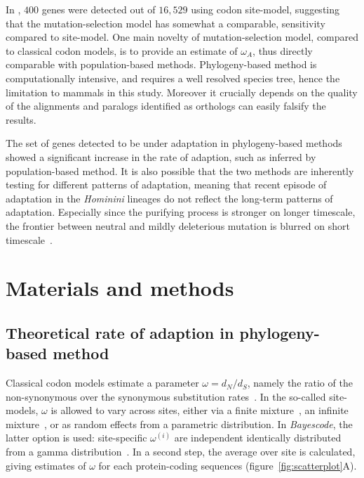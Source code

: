 \documentclass{article}
\newcommand{\dn}{d_N}
\newcommand{\ds}{d_S}
\newcommand{\dnds}{\dn / \ds}
\begin{document}
In \citet{kosiol_patterns_2008}, $400$ genes were detected out of $16,529$ using codon site-model, suggesting that the mutation-selection model has somewhat a comparable, sensitivity compared to site-model.
One main novelty of mutation-selection model, compared to classical codon models, is to provide an estimate of $\omega_A$, thus directly comparable with population-based methods.
Phylogeny-based method is computationally intensive, and requires a well resolved species tree, hence the limitation to mammals in this study.
Moreover it crucially depends on the quality of the alignments and paralogs identified as orthologs can easily falsify the results.

The set of genes detected to be under adaptation in phylogeny-based methods showed a significant increase in the rate of adaption, such as inferred by population-based method.
It is also possible that the two methods are inherently testing for different patterns of adaptation, meaning that recent episode of adaptation in the \textit{Hominini} lineages do not reflect the long-term patterns of adaptation.
Especially since the purifying process is stronger on longer timescale, the frontier between neutral and mildly deleterious mutation is blurred on short timescale~\citep{ho_time_2005}.

\section*{Materials and methods}

\subsection*{Theoretical rate of adaption in phylogeny-based method }
Classical codon models estimate a parameter $\omega=\dnds$, namely the ratio of the non-synonymous over the synonymous substitution rates~\citep{muse_likelihood_1994,goldman_codon-based_1994}.
In the so-called site-models, $\omega$ is allowed to vary across sites, either via a finite mixture~\citep{yang_codon-substitution_2000}, an infinite mixture~\citep{huelsenbeck_dirichlet_2006}, or as random effects from a parametric distribution.
In \textit{Bayescode}, the latter option is used: site-specific $\omega^{(i)}$ are independent identically distributed from a gamma distribution~\citep{lartillot_phylobayes_2013}.
In a second step, the average over site is calculated, giving estimates of $\omega$ for each protein-coding sequences (figure~\ref{fig:scatterplot}A).
\end{document}

